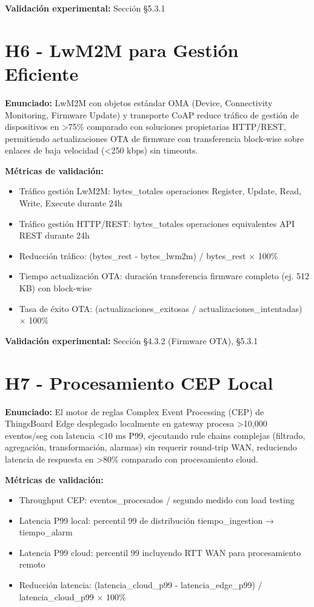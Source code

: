 \textbf{Validación experimental:} Sección §5.3.1

\section{H6 - LwM2M para Gestión Eficiente}

\textbf{Enunciado:} LwM2M con objetos estándar OMA (Device, Connectivity Monitoring, Firmware Update) y transporte CoAP reduce tráfico de gestión de dispositivos en >75\% comparado con soluciones propietarias HTTP/REST, permitiendo actualizaciones OTA de firmware con transferencia block-wise sobre enlaces de baja velocidad (<250 kbps) sin timeouts.

\textbf{Métricas de validación:}
\begin{itemize}
\item Tráfico gestión LwM2M: bytes\_totales operaciones Register, Update, Read, Write, Execute durante 24h
\item Tráfico gestión HTTP/REST: bytes\_totales operaciones equivalentes API REST durante 24h
\item Reducción tráfico: (bytes\_rest - bytes\_lwm2m) / bytes\_rest $\times$ 100\%
\item Tiempo actualización OTA: duración transferencia firmware completo (ej. 512 KB) con block-wise
\item Tasa de éxito OTA: (actualizaciones\_exitosas / actualizaciones\_intentadas) $\times$ 100\%
\end{itemize}

\textbf{Validación experimental:} Sección §4.3.2 (Firmware OTA), §5.3.1

\section{H7 - Procesamiento CEP Local}

\textbf{Enunciado:} El motor de reglas Complex Event Processing (CEP) de ThingsBoard Edge desplegado localmente en gateway procesa >10,000 eventos/seg con latencia <10 ms P99, ejecutando rule chains complejas (filtrado, agregación, transformación, alarmas) sin requerir round-trip WAN, reduciendo latencia de respuesta en >80\% comparado con procesamiento cloud.

\textbf{Métricas de validación:}
\begin{itemize}
\item Throughput CEP: eventos\_procesados / segundo medido con load testing
\item Latencia P99 local: percentil 99 de distribución tiempo\_ingestion → tiempo\_alarm
\item Latencia P99 cloud: percentil 99 incluyendo RTT WAN para procesamiento remoto
\item Reducción latencia: (latencia\_cloud\_p99 - latencia\_edge\_p99) / latencia\_cloud\_p99 $\times$ 100\%
\end{itemize}

